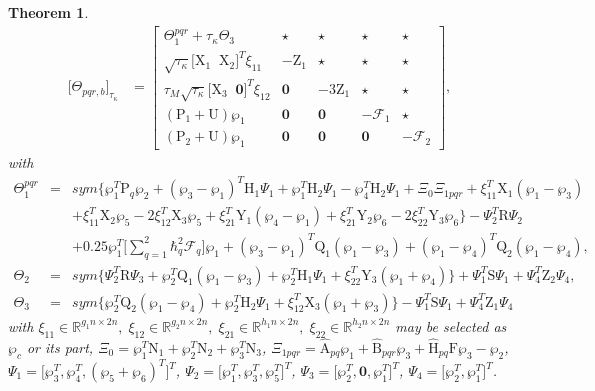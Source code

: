 \documentclass[preprint,11pt]{elsarticle}
\newtheorem{Thm}{Theorem}
\begin{document}
\begin{Thm}
\begin{align*}
\big[ \Theta_{pqr,b}\big]_{\tau_\kappa}&=
 \begin{bmatrix}
 \Theta_1^{pqr}+\tau_\kappa\Theta_3& \star&\star&\star&\star\\
 \sqrt{\tau_\kappa}\big[ \mathrm{X}_1\;\;\mathrm{X}_2 \big]^T\xi_{11}&-\mathrm{Z}_1&\star&\star&\star\\
 \tau_M \sqrt{\tau_\kappa}\big[ \mathrm{X}_3\;\;\mathbf{0} \big]^T\xi_{12}&\mathbf{0}&-3\mathrm{Z}_1&\star&\star\\
 (\mathrm{P}_1+\mathrm{U})\wp_1&\mathbf{0}&\mathbf{0}&-{\mathcal{F}}_1&\star\\
 (\mathrm{P}_2+\mathrm{U})\wp_1&\mathbf{0}&\mathbf{0}&\mathbf{0}&-{\mathcal{F}}_2
 \end{bmatrix},
\end{align*}
with
\begin{eqnarray*}
\Theta_1^{pqr}&=&sym\big\{\wp^T_1\mathrm{P}_q\wp_2+(\wp_3-\wp_1)^T\mathrm{H}_1\Psi_1+\wp^T_1\mathrm{H}_2\Psi_1
-\wp_4^T\mathrm{H}_2\Psi_1+\Xi_0\Xi_{1pqr}+ \xi_{11}^T \mathrm{X}_1(\wp_1-\wp_3)\\
\quad&&+\xi_{11}^T\mathrm{X}_2\wp_5-2\xi_{12}^T\mathrm{X}_3\wp_5+\xi_{21}^T \mathrm{Y}_1(\wp_4-\wp_1)
+\xi_{21}^T\mathrm{Y}_2\wp_6-2\xi_{22}^T\mathrm{Y}_3\wp_6
\big\}-\Psi_2^T\mathrm{R}\Psi_2\\
\quad&&+0.25\wp^T_1\Big[ \sum^{2}_{q=1}\hbar_q^2{\mathcal{F}_q}\Big]\wp_1
+(\wp_3-\wp_1)^T\mathrm{Q}_1(\wp_1-\wp_3)
+(\wp_1-\wp_4)^T\mathrm{Q}_2(\wp_1-\wp_4),\\
\Theta_2&=&sym\big\{ \Psi_2^T\mathrm{R}\Psi_3+\wp_2^T\mathrm{Q}_1(\wp_1-\wp_3)+\wp_2^T\mathrm{H}_1\Psi_1
+\xi_{22}^T\mathrm{Y}_3(\wp_1+\wp_4) \big\}+\Psi_1^T\mathrm{S}\Psi_1+\Psi_4^T\mathrm{Z}_2\Psi_4,\\
\Theta_3&=&sym\big\{ \wp_2^T\mathrm{Q}_2(\wp_1-\wp_4)+\wp_2^T\mathrm{H}_2\Psi_1
+\xi_{12}^T \mathrm{X}_3(\wp_1+\wp_3) \big\}-\Psi_1^T\mathrm{S}\Psi_1+\Psi_4^T\mathrm{Z}_1\Psi_4
\end{eqnarray*}
with $\xi_{11}\in  \mathbb{R}^{g_1n\times 2n},\;\xi_{12}\in  \mathbb{R}^{g_2n\times 2n},\;\xi_{21}\in  \mathbb{R}^{h_1n\times 2n},\;\xi_{22}\in  \mathbb{R}^{h_2n\times 2n}$ may be selected as $\wp_c$ or its part, $\Xi_0=\wp^T_1\mathrm{N}_1+\wp^T_2\mathrm{N}_2+\wp^T_3\mathrm{N}_3$,
$\Xi_{1pqr}=\mathrm{\widehat{A}}_{pq}\wp_1+\mathrm{\widehat{B}}_{pqr}\wp_3+\mathrm{\widehat{H}}_{pq}\mathrm{F}\wp_3-\wp_2$,
$\Psi_1=\big[\wp^T_3,\wp^T_4,(\wp_5+\wp_6) ^T \big]^T$, $\Psi_2=\big[\wp^T_1,\wp^T_3,\wp_5^T \big]^T$, $\Psi_3=\big[\wp^T_2,\mathbf{0},\wp_1^T \big]^T$, $\Psi_4=\big[\wp^T_2,\wp_1^T \big]^T$.
\end{Thm}
\end{document}
